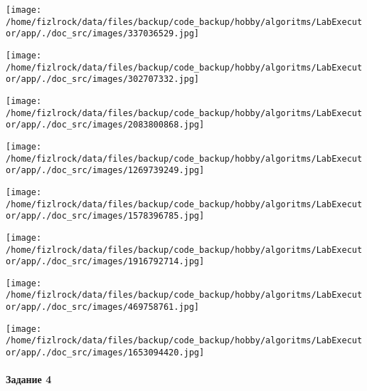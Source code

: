 \documentclass[a4paper, 12pt]{article}
\begin{document}
\texttt{[image: /home/fizlrock/data/files/backup/code\_backup/hobby/algoritms/LabExecutor/app/./doc\_src/images/337036529.jpg]}

\texttt{[image: /home/fizlrock/data/files/backup/code\_backup/hobby/algoritms/LabExecutor/app/./doc\_src/images/302707332.jpg]}

\texttt{[image: /home/fizlrock/data/files/backup/code\_backup/hobby/algoritms/LabExecutor/app/./doc\_src/images/2083800868.jpg]}

\texttt{[image: /home/fizlrock/data/files/backup/code\_backup/hobby/algoritms/LabExecutor/app/./doc\_src/images/1269739249.jpg]}

\texttt{[image: /home/fizlrock/data/files/backup/code\_backup/hobby/algoritms/LabExecutor/app/./doc\_src/images/1578396785.jpg]}

\texttt{[image: /home/fizlrock/data/files/backup/code\_backup/hobby/algoritms/LabExecutor/app/./doc\_src/images/1916792714.jpg]}

\texttt{[image: /home/fizlrock/data/files/backup/code\_backup/hobby/algoritms/LabExecutor/app/./doc\_src/images/469758761.jpg]}

\texttt{[image: /home/fizlrock/data/files/backup/code\_backup/hobby/algoritms/LabExecutor/app/./doc\_src/images/1653094420.jpg]}
\pagebreak
\paragraph{Задание 4}
\end{document}
